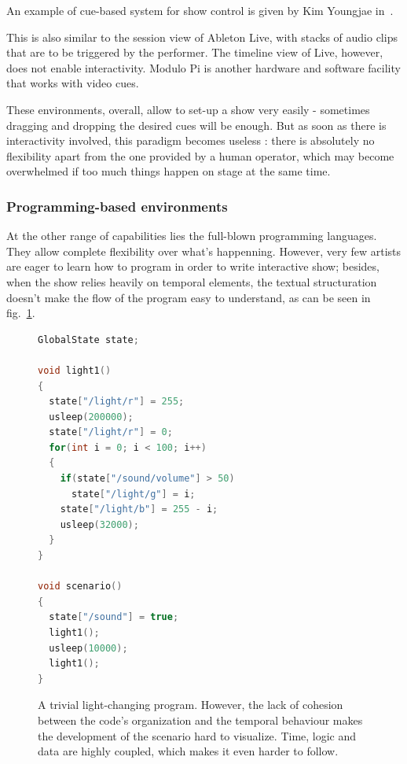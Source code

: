 \documentclass{sigchi}
\begin{document}
An example of cue-based system for show control is given by Kim Youngjae in~\cite{kim_unified_2013}. 

This is also similar to the session view of Ableton Live, with stacks of audio clips that are to be triggered by the performer. The timeline view of Live, however, does not enable interactivity. Modulo Pi is another hardware and software facility that works with video cues.

These environments, overall, allow to set-up a show very easily - sometimes dragging and dropping the desired cues will be enough. But as soon as there is interactivity involved, this paradigm becomes useless : there is absolutely no flexibility apart from the one provided by a human operator, which may become overwhelmed if too much things happen on stage at the same time.

\subsubsection{Programming-based environments}
At the other range of capabilities lies the full-blown programming languages. They allow complete flexibility over what's happenning. However, very few artists are eager to learn how to program in order to write interactive show; besides, when the show relies heavily on temporal elements, the textual structuration doesn't make the flow of the program easy to understand, as can be seen in fig.~\ref{fig.hardtofollow}.

\begin{figure}
\begin{lstlisting}[language=c++]
GlobalState state;

void light1()
{
  state["/light/r"] = 255;
  usleep(200000);    
  state["/light/r"] = 0;
  for(int i = 0; i < 100; i++)
  {
    if(state["/sound/volume"] > 50)
      state["/light/g"] = i;        
    state["/light/b"] = 255 - i;
    usleep(32000);
  }
}

void scenario()
{
  state["/sound"] = true;
  light1();
  usleep(10000);
  light1();
}
\end{lstlisting}
\caption{A trivial light-changing program. However, the lack of cohesion between the code's organization and the temporal behaviour makes the development of the scenario hard to visualize. Time, logic and data are highly coupled, which makes it even harder to follow.}
\label{fig.hardtofollow}
\end{figure}
\end{document}
